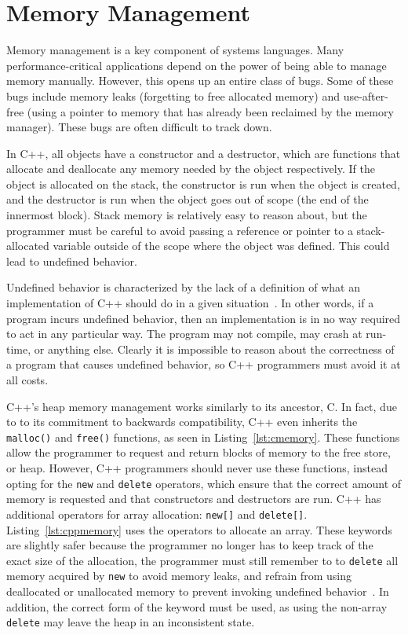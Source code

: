 \documentclass[finalcopy]{srpaper}
\begin{document}
\section{Memory Management}

Memory management is a key component of systems languages. Many
performance-critical applications depend on the power of being able to manage
memory manually. However, this opens up an entire class of bugs. Some of these
bugs include memory leaks (forgetting to free allocated memory) and
use-after-free (using a pointer to memory that has already been reclaimed by
the memory manager). These bugs are often difficult to track down.

In C++, all objects have a constructor and a destructor, which are functions
that allocate and deallocate any memory needed by the object respectively. If
the object is allocated on the stack, the constructor is run when the object
is created, and the destructor is run when the object goes out of scope (the
end of the innermost block). Stack memory is relatively easy to reason about,
but the programmer must be careful to avoid passing a reference or pointer to
a stack-allocated variable outside of the scope where the object was defined.
This could lead to undefined behavior.

Undefined behavior is characterized by the lack of a definition of what an
implementation of C++ should do in a given situation~\cite{iso/iec}. In other
words, if a program incurs undefined behavior, then an implementation is in no
way required to act in any particular way. The program may not compile, may
crash at run-time, or anything else. Clearly it is impossible to reason about
the correctness of a program that causes undefined behavior, so C++ programmers
must avoid it at all costs.

C++'s heap memory management works similarly to its ancestor, C. In fact, due
to to its commitment to backwards compatibility, C++ even inherits the
\texttt{malloc()} and \texttt{free()} functions, as seen in
Listing~\ref{lst:cmemory}. These functions allow the programmer to request and
return blocks of memory to the free store, or heap. However, C++ programmers
should never use these functions, instead opting for the \texttt{new} and
\texttt{delete} operators, which ensure that the correct amount of memory is
requested and that constructors and destructors are run. C++ has additional
operators for array allocation: \texttt{new[]} and \texttt{delete[]}.
Listing~\ref{lst:cppmemory} uses the operators to allocate an array. These
keywords are slightly safer because the programmer no longer has to keep track
of the exact size of the allocation, the programmer must still remember to to
\texttt{delete} all memory acquired by \texttt{new} to avoid memory leaks, and
refrain from using deallocated or unallocated memory to prevent invoking
undefined behavior~\cite{stroustrup2013the}. In addition, the correct form of
the keyword must be used, as using the non-array \texttt{delete} may leave the
heap in an inconsistent state.
\end{document}
